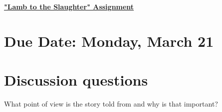 \documentclass[12pt]{article} %
\begin{document}
	\renewcommand*{\coursecode}{MATH 235} %
	\renewcommand*{\assgnnumber}{Assignment 1} %
	\renewcommand*{\submdate}{September 14, 2021} %
	\renewcommand*{\studentfname}{Abdullah} %
	\renewcommand*{\studentlname}{Zubair} %
    \renewcommand*{\proofname}{Proof:}

	\renewcommand\qedsymbol{$\blacksquare$}
	\setfigpath
	\fancyhfoffset[L,O]{0pt} %




\begin{center}
	\textbf{\underline{\Huge{"Lamb to the Slaughter" Assignment}}}
\end{center}

\section*{Due Date: Monday, March 21}


\section*{Discussion questions}
\begin{qstn}
  What point of view is the story told from and why is that important?
\end{qstn}
\end{document}
